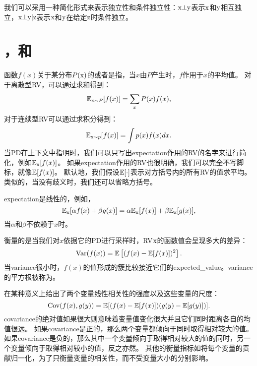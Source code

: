 我们可以采用一种简化形式来表示独立性和条件独立性：$\mathrm{x} \bot \mathrm{y}$表示$\mathrm{x}$和$\mathrm{y}$相互独立，$\mathrm{x} \bot \mathrm{y} | \mathrm{z}$表示$\mathrm{x}$和$\mathrm{y}$在给定$\mathrm{z}$时条件独立。

\section{，和}
\label{sec:expectation_variance_and_covariance}

函数$f(x)$关于某分布$P(\mathrm{x})$的或者是指，当$x$由$P$产生时，$f$作用于$x$的平均值。
对于离散型\gls{RV}，可以通过求和得到：
\begin{equation}
\mathbb{E}_{\mathrm{x} \sim P}[f(x)] = \sum_x P(x)f(x),
\end{equation}
对于连续型\gls{RV}可以通过求积分得到：
\begin{equation}
\mathbb{E}_{\mathrm{x} \sim p}[f(x)] = \int p(x)f(x)dx.
\end{equation}
当\gls{PD}在上下文中指明时，我们可以只写出\gls{expectation}作用的\gls{RV}的名字来进行简化，例如$\mathbb{E}_{\mathrm{x}}[f(x)]$。
如果\gls{expectation}作用的\gls{RV}也很明确，我们可以完全不写脚标，就像$\mathbb{E}[f(x)]$。
默认地，我们假设$\mathbb{E}[\cdot]$表示对方括号内的所有\gls{RV}的值求平均。
类似的，当没有歧义时，我们还可以省略方括号。


\gls{expectation}是线性的，例如，
\begin{equation}
\mathbb{E}_{\mathrm{x}}[\alpha f(x) + \beta g(x)] = \alpha \mathbb{E}_{\mathrm{x}}[f(x)] + \beta \mathbb{E}_{\mathrm{x}}[g(x)],
\end{equation}
当$\alpha$和$\beta$不依赖于$x$时。

衡量的是当我们对$x$依据它的\gls{PD}进行采样时，\gls{RV}$\mathrm{x}$的函数值会呈现多大的差异：
\begin{equation}
\text{Var}(f(x)) = \mathbb{E} \left [(f(x) - \mathbb{E}[f(x)])^2 \right].
\end{equation}
当\gls{variance}很小时，$f(x)$的值形成的簇比较接近它们的\gls{expected_value}。\gls{variance}的平方根被称为。

在某种意义上给出了两个变量线性相关性的强度以及这些变量的尺度：
\begin{equation}
\text{Cov}(f(x), g(y)) = \mathbb{E}[ ( f(x)-\mathbb{E}[f(x)] )( g(y)-\mathbb{E}[g(y)] ) ].
\end{equation}
\gls{covariance}的绝对值如果很大则意味着变量值变化很大并且它们同时距离各自的均值很远。
如果\gls{covariance}是正的，那么两个变量都倾向于同时取得相对较大的值。
如果\gls{covariance}是负的，那么其中一个变量倾向于取得相对较大的值的同时，另一个变量倾向于取得相对较小的值，反之亦然。
其他的衡量指标如将每个变量的贡献归一化，为了只衡量变量的相关性，而不受变量大小的分别影响。

